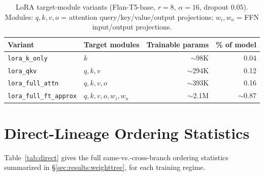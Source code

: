 \documentclass{article}
\theoremstyle{definition}
\theoremstyle{plain}
\begin{document}
\begin{table}[h]
\caption{LoRA target-module variants (Flan-T5-base, $r=8$, $\alpha=16$, dropout $0.05$). Modules:
$q,k,v,o$ = attention query/key/value/output projections; $w_i,w_o$ = FFN input/output projections.}
\label{tab:lora_variants}
\centering
\begin{tabular}{ll r r}
\toprule
Variant & Target modules & Trainable params & \% of model \\
\midrule
\texttt{lora\_k\_only}        & $k$                       & $\sim$98K  & 0.04 \\
\texttt{lora\_qkv}            & $q,k,v$                   & $\sim$294K & 0.12 \\
\texttt{lora\_full\_attn}     & $q,k,v,o$                 & $\sim$393K & 0.16 \\
\texttt{lora\_full\_ft\_approx}& $q,k,v,o,w_i,w_o$        & $\sim$2.1M & $\sim$0.87 \\
\bottomrule
\end{tabular}
\end{table}

\section{Direct-Lineage Ordering Statistics}
\label{app:direct}
Table~\ref{tab:direct} gives the full same-vs.-cross-branch ordering statistics summarized in
\S\ref{sec:results:weighttree}, for each training regime.
\end{document}
